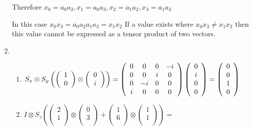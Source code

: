 \documentclass[11pt,fleqn]{article}
\begin{document}
\begin{enumerate}
Therefore $ x_{0} = a_{0}a_{2} , x_1 = a_0a_3 , x_2=a_1a_2 , x_3=a_1a_3$ 

In this case $x_0x_3=a_0a_2a_1a_3 = x_1x_2$ If a value exists where $x_0x_3 \ne x_1x_2$ then this value cannot be expressed as a tensor product of two vectors. 
\item %
\begin{enumerate}
\item 
$S_{x} \otimes S_{y}
\left(\left(\begin{array}{c} 
1\\ 
0\\ 
\end{array}\right) \otimes 
\left(\begin{array}{c} 
0\\ 
i\\ 
\end{array}\right)\right)=
\left(\begin{array}{c c c c} 
0 & 0 & 0 & -i\\ 
0 & 0 & i & 0\\ 
0 & -i & 0 & 0 \\
i & 0 & 0 & 0
\end{array}\right)
\left(\begin{array}{c} 
0\\ 
i\\ 
0\\
0 
\end{array}\right)=
\left(\begin{array}{c} 
0\\ 
0\\ 
1\\
0 
\end{array}\right)$
\item

$I \otimes S_{z}
\left(\left(\begin{array}{c} 
2\\ 
1\\ 
\end{array}\right) \otimes 
\left(\begin{array}{c} 
0\\ 
3\\ 
\end{array}\right)+ 
\left(\begin{array}{c} 
1\\ 
6\\ 
\end{array}\right)\otimes 
\left(\begin{array}{c} 
1\\ 
1\\ 
\end{array}\right)\right)=$ \\


\end{enumerate}
\end{enumerate}
\end{document}
